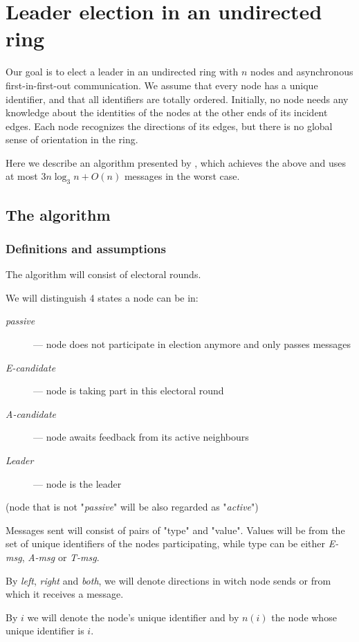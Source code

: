 \documentclass{article}
\begin{document}
\section*{Leader election in an undirected ring}
Our goal is to elect a leader in an undirected ring with $n$ nodes and asynchronous first-in-first-out communication.  We assume that every node has a unique identifier, and that all identifiers are
totally ordered. Initially, no node needs any knowledge about the identities of the nodes at the
other ends of its incident edges. Each node recognizes the directions of its edges, but there is no global sense of orientation in the ring. 

Here we describe an algorithm presented by \cite{ROTEM1987575}, which achieves the above and uses at most $3 n\log_{3}n + O(n)$ messages in the worst case.
\subsection*{The algorithm}
\subsubsection*{Definitions and assumptions}
The algorithm will consist of electoral rounds.

We will distinguish 4 states a node can be in:
\begin{description}
\item[\textit{passive}] --- node does not participate in election anymore and only passes messages
\item[\textit{E-candidate}] --- node is taking part in this electoral round
\item[\textit{A-candidate}] --- node awaits feedback from its active neighbours
\item[\textit{Leader}] --- node is the leader
\end{description}
(node that is not "\textit{passive}" will be also regarded as "\textit{active}")

Messages sent will consist of pairs of "type" and "value". Values will be from the set of unique identifiers of the nodes participating, while type can be  either \textit{E-msg}, \textit{A-msg} or \textit{T-msg}.

By  \textit{left}, \textit{right} and  \textit{both}, we will denote directions in witch node sends or from which it receives a message.

By $i$ we will denote the node's unique identifier and by $n(i)$ the node whose unique identifier is $i$.
\end{document}
